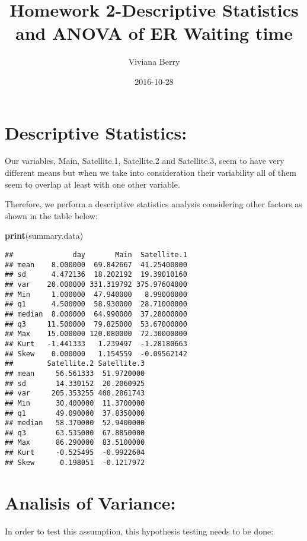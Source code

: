 \documentclass[]{tufte-handout}
\title{Homework 2-Descriptive Statistics and ANOVA of ER Waiting time}
\author{Viviana Berry}
\date{2016-10-28}
\newenvironment{Shaded}{}{}
\newcommand{\KeywordTok}[1]{\textcolor[rgb]{0.00,0.44,0.13}{\textbf{{#1}}}}
\newcommand{\NormalTok}[1]{{#1}}
\begin{document}
\maketitle




\section{Descriptive Statistics:}\label{descriptive-statistics}

Our variables, Main, Satellite.1, Satellite.2 and Satellite.3, seem to
have very different means but when we take into consideration their
variability all of them seem to overlap at least with one other
variable.

Therefore, we perform a descriptive statistics analysis considering
other factors as shown in the table below:

\begin{Shaded}
\begin{Highlighting}[]
\KeywordTok{print}\NormalTok{(summary.data)}
\end{Highlighting}
\end{Shaded}

\begin{verbatim}
##              day       Main  Satellite.1
## mean    8.000000  69.842667  41.25400000
## sd      4.472136  18.202192  19.39010160
## var    20.000000 331.319792 375.97604000
## Min     1.000000  47.940000   8.99000000
## q1      4.500000  58.930000  28.71000000
## median  8.000000  64.990000  37.28000000
## q3     11.500000  79.825000  53.67000000
## Max    15.000000 120.080000  72.30000000
## Kurt   -1.441333   1.239497  -1.28180663
## Skew    0.000000   1.154559  -0.09562142
##        Satellite.2 Satellite.3
## mean     56.561333  51.9720000
## sd       14.330152  20.2060925
## var     205.353255 408.2861743
## Min      30.400000  11.3700000
## q1       49.090000  37.8350000
## median   58.370000  52.9400000
## q3       63.535000  67.8850000
## Max      86.290000  83.5100000
## Kurt     -0.525495  -0.9922604
## Skew      0.198051  -0.1217972
\end{verbatim}

\section{Analisis of Variance:}\label{analisis-of-variance}

In order to test this assumption, this hypothesis testing needs to be
done:
\end{document}
